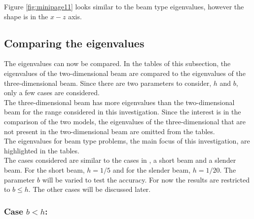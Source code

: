 \documentclass[../../main.tex]{subfiles}
\begin{document}
Figure \ref{fig:minipage11} looks similar to the beam type eigenvalues, however the shape is in the $x-z$ axis.\\

\subsection{Comparing the eigenvalues}
The eigenvalues can now be compared. In the tables of this subsection, the eigenvalues of the two-dimensional beam are compared to the eigenvalues of the three-dimensional beam. Since there are two parameters to consider, $h$ and $b$, only a few cases are considered.\\

The three-dimensional beam has more eigenvalues than the two-dimensional beam for the range considered in this investigation. Since the interest is in the comparison of the two models, the eigenvalues of the three-dimensional that are not present in the two-dimensional beam are omitted from the tables.\\

The eigenvalues for beam type problems, the main focus of this investigation, are highlighted in the tables.\\

The cases considered are similar to the cases in \cite{LVV09}, a short beam and a slender beam. For the short beam, $h = 1/5$ and for the slender beam, $h = 1/20$. The parameter $b$ will be varied to test the accuracy. For now the results are restricted to $b \leq h$. The other cases will be discussed later.\\

\subsubsection*{Case $b < h$:}
\end{document}
